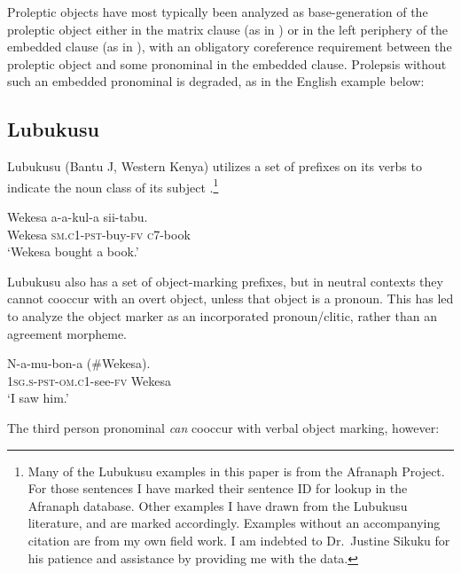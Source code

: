 \documentclass[output=paper,colorlinks,citecolor=brown]{langscibook}
\begin{document}
Proleptic objects have most typically been analyzed as base-generation of the proleptic object either in the matrix clause (as in \citealt{Salzmann2017Chapter}) or in the left periphery of the embedded clause (as in \citealt{VanKoppenEtAl2016}), with an obligatory coreference requirement between the proleptic object and some pronominal in the embedded clause. Prolepsis without such an embedded pronominal is degraded, as in the English example below:

\z

\subsection{Lubukusu}\label{sec:newkirk:1.2}

Lubukusu (Bantu J, Western Kenya) utilizes a set of prefixes on its verbs to indicate the noun class of its subject .\footnote{Many of the Lubukusu examples in this paper is from the Afranaph Project. For those sentences I have marked their sentence ID for lookup in the Afranaph database. Other examples I have drawn from the Lubukusu literature, and are marked accordingly. Examples without an accompanying citation are from my own field work. I am indebted to Dr.\ Justine Sikuku for his patience and assistance by providing me with the data. \nocite{SafirSikuku2011}}

\ea%
    \label{ex:newkirk:4}
    \gll    Wekesa \alert{a}-a-kul-a sii-tabu.\\
			Wekesa \textsc{sm.c1-pst-}buy\textsc{-fv} \textsc{c7-}book\\
	\glt    `Wekesa bought a book.'\hfill \citep[ex. 11a]{Wasike2006}
\z

Lubukusu also has a set of object-marking prefixes, but in neutral contexts they cannot cooccur with an overt object, unless that object is a pronoun. This has led \citet{DiercksSikuku2015, SikukuEtAl2018} to analyze the object marker as an incorporated pronoun/clitic, rather than an agreement morpheme.

\ea%
    \label{ex:newkirk:5}
    \gll    N-a-\alert{mu}-bon-a (\#Wekesa).\\
			\textsc{1sg.s-pst-om.c1-}see\textsc{-fv} \hphantom{(\#}Wekesa\\
	\glt    `I saw him.' \hfill \citep[ex. 2]{DiercksSikuku2015}
\z

The third person pronominal  \emph{can} cooccur with verbal object marking, however:
\end{document}
